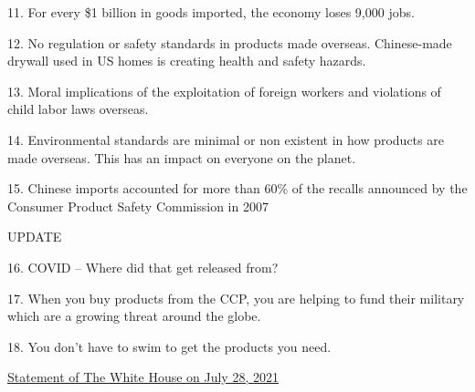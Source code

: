 {{	11. For every \$1 billion in goods imported, the economy loses 9,000 jobs.
	
	12. No regulation or safety standards in products made overseas. Chinese-made drywall used in US homes is creating health and safety hazards.
	
	13. Moral implications of the exploitation of foreign workers and violations of child labor laws overseas.
	
	14. Environmental standards are minimal or non existent in how products are made overseas. This has an impact on everyone on the planet.
	
	15. Chinese imports accounted for more than 60\% of the recalls announced by the Consumer Product Safety Commission in 2007
	
	UPDATE
	
	16. COVID – Where did that get released from?
	
	17. When you buy products from the CCP, you are helping to fund their military which are a growing threat around the globe.
	
	18. You don’t have to swim to get the products you need.}\medskip
	
	\href{https://www.whitehouse.gov/briefing-room/statements-releases/2021/07/28/fact-sheet-biden-harris-administration-issues-proposed-buy-american-rule-advancing-the-presidents-commitment-to-ensuring-the-future-of-america-is-made-in-america-by-all-of-americas/}{Statement of The White House on July 28, 2021}
	\medskip
	
	 \citet[p. 16]{Dallas2002Fruits}
}

\pbn
